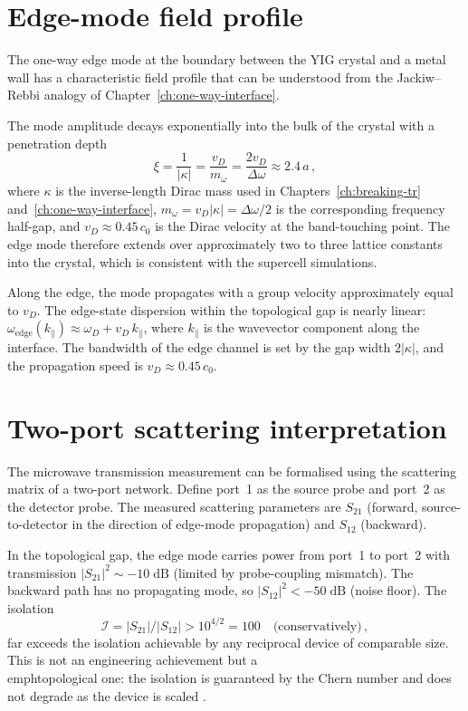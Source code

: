\section{Edge-mode field profile}
\label{sec:ch9-edge-profile}

The one-way edge mode at the boundary between the YIG crystal and a
metal wall has a characteristic field profile that can be understood
from the Jackiw--Rebbi analogy of Chapter~\ref{ch:one-way-interface}.

The mode amplitude decays exponentially into the bulk of the crystal
with a penetration depth
\begin{equation}\label{eq:ch9-penetration}
  \xi = \frac{1}{|\kappa|}
  = \frac{v_D}{m_\omega}
  = \frac{2v_D}{\Delta\omega}
  \approx 2.4\,a\,,
\end{equation}
where $\kappa$ is the inverse-length Dirac mass used in
Chapters~\ref{ch:breaking-tr} and~\ref{ch:one-way-interface},
$m_\omega=v_D|\kappa|=\Delta\omega/2$ is the corresponding frequency
half-gap, and $v_D\approx 0.45\,c_0$ is the Dirac velocity at the
band-touching point.  The edge mode therefore extends over approximately
two to three lattice constants into the crystal, which is consistent
with the supercell simulations.

Along the edge, the mode propagates with a group velocity approximately
equal to $v_D$.  The edge-state dispersion within the topological gap
is nearly linear:
$\omega_{\mathrm{edge}}(k_\parallel)\approx\omega_D+v_D\,k_\parallel$,
where $k_\parallel$ is the wavevector component along the interface.
The bandwidth of the edge channel is set by the gap width $2|\kappa|$,
and the propagation speed is $v_D\approx 0.45\,c_0$.

\section{Two-port scattering interpretation}
\label{sec:ch9-scattering}

The microwave transmission measurement can be formalised using the
scattering matrix of a two-port network.  Define port~1 as the
source probe and port~2 as the detector probe.  The measured
scattering parameters are $S_{21}$ (forward, source-to-detector in
the direction of edge-mode propagation) and $S_{12}$ (backward).

In the topological gap, the edge mode carries power from port~1 to
port~2 with transmission $|S_{21}|^2\sim -10\;\mathrm{dB}$ (limited
by probe-coupling mismatch).  The backward path has no propagating
mode, so $|S_{12}|^2<-50\;\mathrm{dB}$ (noise floor).  The isolation
\begin{equation}\label{eq:ch9-isolation}
  \mathcal{I} = |S_{21}|/|S_{12}| > 10^{4/2}=100
  \quad\text{(conservatively)}\,,
\end{equation}
far exceeds the isolation achievable by any reciprocal device of
comparable size.  This is not an engineering achievement but a
\\emph{topological} one: the isolation is guaranteed by the Chern
number and does not degrade as the device is scaled
\cite{nature2026observation,haldane2008possible}.

